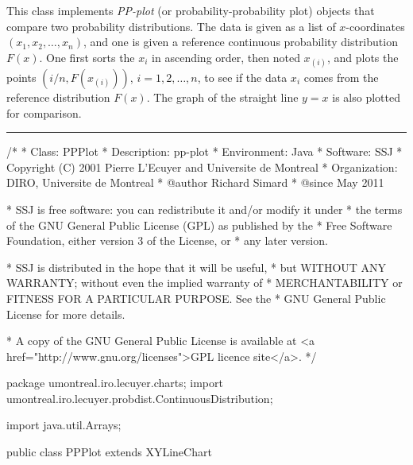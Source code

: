 
This class implements \emph{PP-plot} (or probability-probability plot)
objects that compare two probability distributions.
The data is given as a list of $x$-coordinates $(x_1, x_2, \ldots, x_{n})$,
and one is given a reference continuous probability distribution  $F(x)$.
One first sorts the $x_i$ in ascending order, then noted $x_{(i)}$, and
plots the points $(i/n, F(x_{(i)}))$, $i= 1, 2, \ldots, n$, to see if
the data $x_i$ comes from the reference distribution  $F(x)$.
The graph of the straight line $y=x$ is also plotted for comparison.


\bigskip\hrule
\begin{code}
\begin{hide}
/*
 * Class:        PPPlot
 * Description:  pp-plot
 * Environment:  Java
 * Software:     SSJ 
 * Copyright (C) 2001  Pierre L'Ecuyer and Universite de Montreal
 * Organization: DIRO, Universite de Montreal
 * @author       Richard Simard
 * @since        May 2011

 * SSJ is free software: you can redistribute it and/or modify it under
 * the terms of the GNU General Public License (GPL) as published by the
 * Free Software Foundation, either version 3 of the License, or
 * any later version.

 * SSJ is distributed in the hope that it will be useful,
 * but WITHOUT ANY WARRANTY; without even the implied warranty of
 * MERCHANTABILITY or FITNESS FOR A PARTICULAR PURPOSE.  See the
 * GNU General Public License for more details.

 * A copy of the GNU General Public License is available at
   <a href="http://www.gnu.org/licenses">GPL licence site</a>.
 */
\end{hide}
package umontreal.iro.lecuyer.charts;
   import umontreal.iro.lecuyer.probdist.ContinuousDistribution;\begin{hide}
   import java.util.Arrays;
\end{hide}


public class PPPlot extends XYLineChart \begin{hide} {
   private double[][] U;        // u_i = cdf(x_i)
   private double[][] Lin;      // line y = x

   private void initLinear ()
   {
      // line y = x in [0, 1] by steps of h
      int m = 100;
      double h = 1.0 / m;
      Lin = new double[2][m+1];
      for (int i = 0; i <= m; i++)
         Lin[0][i] = Lin[1][i] = h * i;
   }


   private void initPoints (ContinuousDistribution dist, double[] data,
                            int numPoints)
   {
      int i;
      U = new double[2][numPoints];

      for (i = 0; i < numPoints; i++)
         U[1][i] = dist.cdf(data[i]);
      Arrays.sort(U[1]);
      for (i = 0; i < numPoints; i++)
         U[0][i] = (double) (i+1)/numPoints;
   }\end{hide}
\end{code}

